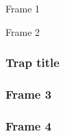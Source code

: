 \documentclass{article}
\begin{document}
\begin{frame}{Frame 1}
\end{frame}
\begin{frame}{Frame 2}
\frametitle{Trap title}
\end{frame}
\begin{frame}
\frametitle{Frame 3}
\end{frame}
\begin{frame}{}
\frametitle{Frame 4}
\end{frame}
\begin{frame}
\end{frame}
\end{document}
